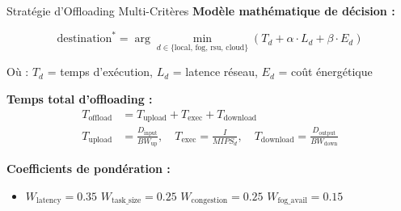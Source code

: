 \documentclass[10pt,aspectratio=169]{beamer}
\begin{document}
\begin{frame}{Strat\'egie d'Offloading Multi-Crit\`eres}
\textbf{Mod\`ele math\'ematique de d\'ecision :}

\begin{equation}
\text{destination}^{*} = \arg\min_{d \in \{\text{local, fog, rsu, cloud}\}} \left( T_d + \alpha \cdot L_d + \beta \cdot E_d \right)
\end{equation}

O\`u : $T_d$ = temps d'ex\'ecution, $L_d$ = latence r\'eseau, $E_d$ = co\^ut \'energ\'etique

\vspace{0.2cm}
\textbf{Temps total d'offloading :}
\begin{align}
T_{\text{offload}} &= T_{\text{upload}} + T_{\text{exec}} + T_{\text{download}} \\
T_{\text{upload}} &= \frac{D_{\text{input}}}{BW_{\text{up}}}, \quad T_{\text{exec}} = \frac{I}{MIPS_d}, \quad T_{\text{download}} = \frac{D_{\text{output}}}{BW_{\text{down}}}
\end{align}

\textbf{Coefficients de pond\'eration :}
\begin{itemize}
    \item $W_{\text{latency}} = 0.35$ \quad $W_{\text{task\_size}} = 0.25$ \quad $W_{\text{congestion}} = 0.25$ \quad $W_{\text{fog\_avail}} = 0.15$
\end{itemize}
\end{frame}
\end{document}
